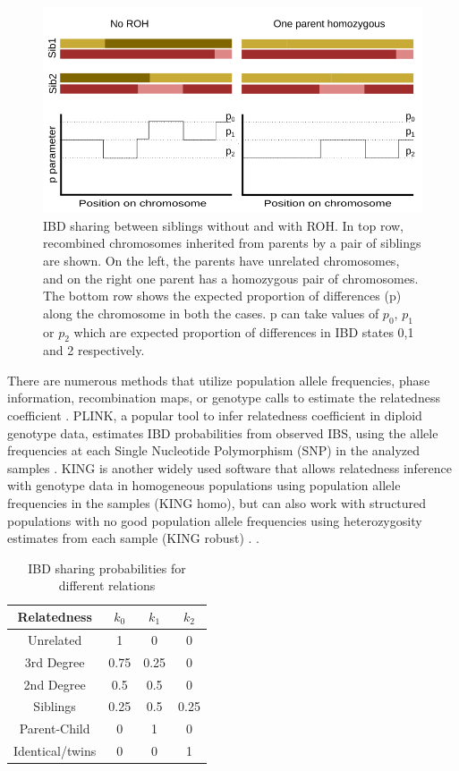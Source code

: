 \documentclass[12pt, letterpaper]{article}
\begin{document}
\begin{figure}[h!]
    \includegraphics[width=18cm]{plots/inkscape_finalImg/schematic_sib.png}
    \centering
    \caption{IBD sharing between siblings without and with ROH. In top row, recombined chromosomes inherited from parents by a pair of siblings are shown. On the left, the parents have unrelated chromosomes, and on the right one parent has a homozygous pair of chromosomes. The bottom row shows the expected proportion of differences (p) along the chromosome in both the cases. p can take values of $p_0$, $p_1$ or $p_2$ which are expected proportion of differences in IBD states 0,1 and 2 respectively.  }
    \label{fig0:schematic}
\end{figure}


There are numerous methods that utilize population allele frequencies, phase information, recombination maps, or genotype calls to estimate the relatedness coefficient \cite{huff_maximum-likelihood_2011,li_relationship_2014,li_accurate_2014,thornton_estimating_2012}. PLINK, a popular tool to infer relatedness coefficient in diploid genotype data, estimates IBD probabilities from observed IBS, using the allele frequencies at each Single Nucleotide Polymorphism (SNP) in the analyzed samples \cite{purcell_plink_2007}. KING is another widely used software that allows relatedness inference with genotype data in homogeneous populations using population allele frequencies in the samples (KING homo), but can also work with structured populations with no good population allele frequencies using heterozygosity estimates from each sample (KING robust) \cite{manichaikul_robust_2010}. . 

\begin{table}
\caption{\label{tab:Table 1}IBD sharing probabilities for different relations}
\begin{tabular}{|c|c|c|c|}
    \hline
    Relatedness & $k_0$ & $k_1$ & $k_2$\\
    \hline
    Unrelated & 1 & 0 & 0\\
    \hline
    3rd Degree & 0.75 & 0.25 & 0\\
    \hline
    2nd Degree & 0.5 & 0.5 & 0\\
    \hline
    Siblings & 0.25 & 0.5 & 0.25\\
    \hline
    Parent-Child & 0 & 1 & 0\\
    \hline
    Identical/twins & 0 & 0 & 1\\
    \hline
\end{tabular}
\label{table1}
\end{table}
\end{document}
